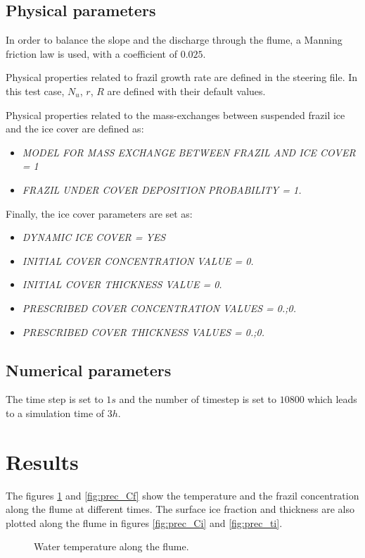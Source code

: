 \subsection{Physical parameters}

In order to balance the slope and the discharge through the flume, a Manning friction law is used, with a coefficient of $0.025$.

Physical properties related to frazil growth rate are defined in the \khione steering file. 
In this test case, $N_u$, $r$, $R$ are defined with their default values.

Physical properties related to the mass-exchanges between suspended frazil ice and the ice cover are defined as: 
\begin{itemize}
	\item\textit{MODEL FOR MASS EXCHANGE BETWEEN FRAZIL AND ICE COVER = 1}
	\item\textit{FRAZIL UNDER COVER DEPOSITION PROBABILITY = 1.}
\end{itemize}
Finally, the ice cover parameters are set as:
\begin{itemize}
	\item\textit{DYNAMIC ICE COVER = YES}
	\item\textit{INITIAL COVER CONCENTRATION VALUE = 0.}
	\item\textit{INITIAL COVER THICKNESS VALUE = 0.}
	\item\textit{PRESCRIBED COVER CONCENTRATION VALUES = 0.;0.}
	\item\textit{PRESCRIBED COVER THICKNESS VALUES = 0.;0.}
\end{itemize}

\subsection{Numerical parameters}
The time step is set to $1s$ and the number of timestep is set to $10800$ which leads to a simulation time of $3h$.

\section{Results}
The figures \ref{fig:prec_temp} and \ref{fig:prec_Cf} show the temperature and the frazil concentration along the flume at different times. The surface ice fraction and thickness are also plotted along the flume in figures \ref{fig:prec_Ci} and \ref{fig:prec_ti}.

\begin{figure}[H]
    \begin{center}
    \end{center}
    \caption{Water temperature along the flume.}
    \label{fig:prec_temp}
\end{figure}

